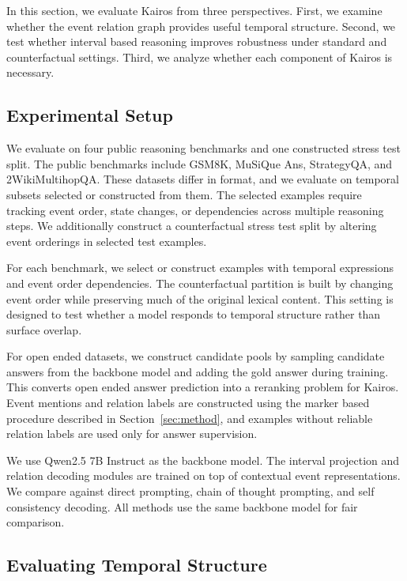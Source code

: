 \documentclass[11pt]{article}
\newcommand{\method}{Kairos}
\begin{document}
In this section, we evaluate \method{} from three perspectives. First, we examine whether the event relation graph provides useful temporal structure. Second, we test whether interval based reasoning improves robustness under standard and counterfactual settings. Third, we analyze whether each component of \method{} is necessary.

\subsection{Experimental Setup}

We evaluate on four public reasoning benchmarks and one constructed stress test split. The public benchmarks include GSM8K, MuSiQue Ans, StrategyQA, and 2WikiMultihopQA. These datasets differ in format, and we evaluate on temporal subsets selected or constructed from them. The selected examples require tracking event order, state changes, or dependencies across multiple reasoning steps. We additionally construct a counterfactual stress test split by altering event orderings in selected test examples.

For each benchmark, we select or construct examples with temporal expressions and event order dependencies. The counterfactual partition is built by changing event order while preserving much of the original lexical content. This setting is designed to test whether a model responds to temporal structure rather than surface overlap.

For open ended datasets, we construct candidate pools by sampling candidate answers from the backbone model and adding the gold answer during training. This converts open ended answer prediction into a reranking problem for \method. Event mentions and relation labels are constructed using the marker based procedure described in Section~\ref{sec:method}, and examples without reliable relation labels are used only for answer supervision.

We use Qwen2.5 7B Instruct as the backbone model. The interval projection and relation decoding modules are trained on top of contextual event representations. We compare against direct prompting, chain of thought prompting, and self consistency decoding. All methods use the same backbone model for fair comparison.

\subsection{Evaluating Temporal Structure}
\end{document}

